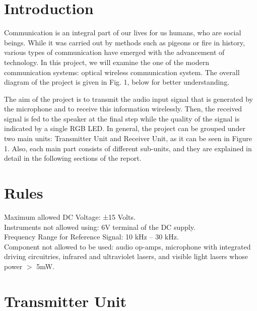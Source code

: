 \documentclass[conference]{IEEEtran}
\begin{document}
\section{Introduction}
Communication is an integral part of our lives for us humans, who are social beings. While it was carried out by methods such as pigeons or fire in history, various types of communication have emerged with the advancement of technology. In this project, we will examine the one of the modern communication systems: optical wireless communication system. The overall diagram of the project is given in Fig. 1, below for better understanding.
 \par The aim of the project is to transmit the audio input signal that is generated by the microphone and to receive this information wirelessly. Then, the received signal is fed to the speaker at the final step while the quality of the signal is indicated by a single RGB LED. In general, the project can be grouped under two main units: Transmitter Unit and Receiver Unit, as it can be seen in Figure 1. Also, each main part consists of different sub-units, and they are explained in detail in the following sections of the report.
\section{Rules}
\noindent Maximum allowed DC Voltage: ±15 Volts. \\
Instruments not allowed using: 6V terminal of the DC supply.\\ 
Frequency Range for Reference Signal: 10 kHz – 30 kHz. \\
Component not allowed to be used: audio op-amps, microphone with integrated driving circuitries, infrared and ultraviolet lasers, and visible light lasers whose power \(>\) 5mW.
\section{Transmitter Unit}
\end{document}

